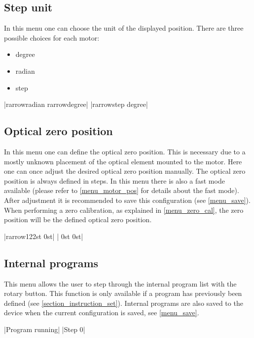 \subsection{Step unit}
\label{chp:change_step_unit}
In this menu one can choose the unit of the displayed position. There
are three possible choices for each motor:
\begin{itemize}
\item degree
\item radian
\item step
\end{itemize}
\begin{center}
  |{rarrow}radian {rarrow}degree|
             |{rarrow}step    degree|
\end{center}


\subsection{Optical zero position}
In this menu one can define the optical zero position. This is
necessary due to a mostly unknown placement of the optical element
mounted to the motor. Here one can once adjust the desired optical
zero position manually. The optical zero position is always
defined in steps. In this menu there is also a fast mode available
(please refer to \ref{menu_motor_pos} for details about the fast mode).
After adjustment it is recommended to save this configuration
(see \ref{menu_save}).
When performing a zero calibration, as explained in \ref{menu_zero_cal},
the zero position will be the defined optical zero position.
\begin{center}
  |{rarrow}122st   0st|
             | 0st     0st|
\end{center}


\subsection{Internal programs}
This menu allows the user to step through the internal program list
with the rotary button.
This function is only available if a program has previously been
defined (see \ref{section_instruction_set}).
Internal programs are also saved to the device when the current
configuration is saved, see \ref{menu_save}.
\begin{center}
  |Program running|
             |Step 0|
\end{center}


